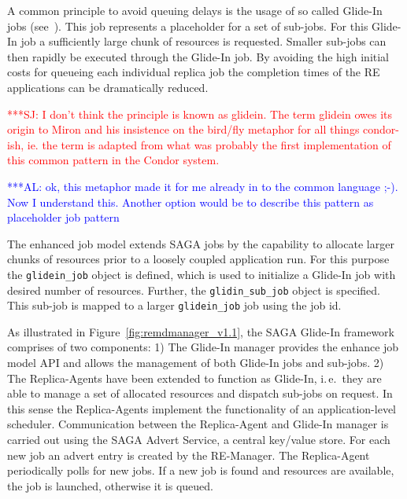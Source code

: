 \documentclass{rspublic}
\newcommand{\alnote}[1]{ {\textcolor{blue} { ***AL: #1 }}}
\newcommand{\jhanote}[1]{ {\textcolor{red} { ***SJ: #1 }}}
\newcommand{\alnote}[1]{}
\newcommand{\jhanote}[1]{}
\newcommand{\replicaagent}[1]{Replica-Agent }
\begin{document}
A common principle to avoid queuing delays is the usage of so called
Glide-In jobs (see~\cite{citeulike:291860}). This job represents a
placeholder for a set of sub-jobs. For this Glide-In job a
sufficiently large chunk of resources is requested. Smaller sub-jobs
can then rapidly be executed through the Glide-In job. By avoiding the
high initial costs for queueing each individual replica job the
completion times of the RE applications can be dramatically reduced.


\jhanote{I don't think the principle is known as glidein. The term
  glidein owes its origin to Miron and his insistence on the bird/fly
  metaphor for all things condor-ish, ie. the term is adapted from
  what was probably the first implementation of this common pattern in
  the Condor system.}

\alnote{ok, this metaphor made it for me already in to the common
  language ;-). Now I understand this. Another option would be to
  describe this pattern as placeholder job pattern}


The enhanced job model extends SAGA jobs by the capability to allocate
larger chunks of resources prior to a loosely coupled application
run. For this purpose the \texttt{glidein\_job} object is defined,
which is used to initialize a Glide-In job with desired number of
resources.  Further, the \texttt{glidin\_sub\_job} object is
specified. This sub-job is mapped to a larger \texttt{glidein\_job}
job using the job id.
                      

As illustrated in Figure~\ref{fig:remdmanager_v1.1}, the SAGA Glide-In
framework comprises of two components: 1) The Glide-In manager
provides the enhance job model API and allows the management of both
Glide-In jobs and sub-jobs.  2) The Replica-Agents have been extended
to function as Glide-In, i.\,e.\ they are able to manage a set of
allocated resources and dispatch sub-jobs on request. In this sense
the Replica-Agents implement the functionality of an application-level
scheduler. Communication between the Replica-Agent and Glide-In
manager is carried out using the SAGA Advert Service, a central
key/value store. For each new job an advert entry is created by the
RE-Manager. The \replicaagent\ periodically polls for new jobs.  If a
new job is found and resources are available, the job is launched,
otherwise it is queued.
\end{document}
